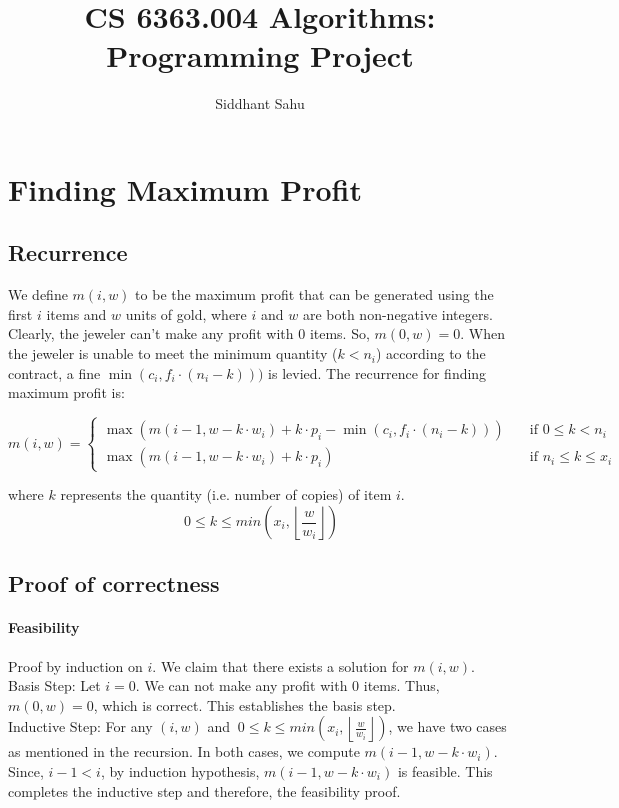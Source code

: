 \documentclass{article}
\title{CS 6363.004 Algorithms: Programming Project}
\author{Siddhant Sahu}
\begin{document}
\maketitle

\section{Finding Maximum Profit}

\subsection{Recurrence}
We define $m(i, w)$ to be the maximum profit that can be generated using the first $i$ items and $w$ units of gold, where $i$ and $w$ are both non-negative integers. Clearly, the jeweler can't make any profit with 0 items. So, $m(0, w) = 0$. 
When the jeweler is unable to meet the minimum quantity ($k < n_i$) according to the contract, a fine $\min (c_i, f_i \cdot (n_i - k)))$ is levied. The recurrence for finding maximum profit is:

\[ m(i, w) =
\begin{cases}
\max (m(i-1, w-k \cdot w_i) + k \cdot p_i - \min (c_i, f_i \cdot (n_i - k)))       & \quad \text{if } 0 \leq k < n_i\\
\max (m(i-1, w-k \cdot w_i) + k \cdot p_i)  & \quad \text{if } n_i \leq k \leq x_i
\end{cases}
\]

where $k$ represents the quantity (i.e. number of copies) of item $i$.
$$\ 0 \leq k \leq min\left(x_i, \left\lfloor\frac{w}{w_i}\right\rfloor\right)$$

\subsection{Proof of correctness}

\paragraph{Feasibility}
Proof by induction on $i$. We claim that there exists a solution for $m(i, w)$.\\
Basis Step: Let $i = 0$. We can not make any profit with 0 items. Thus, $m(0, w) = 0$, which is correct. This establishes the basis step.\\
Inductive Step: For any $(i, w)$ and $\ 0 \leq k \leq min\left(x_i, \left\lfloor\frac{w}{w_i}\right\rfloor\right)$, we have two cases as mentioned in the recursion. In both cases, we compute $m(i-1, w-k \cdot w_i)$. Since, $i-1 < i$, by induction hypothesis, $m(i-1, w-k \cdot w_i)$ is feasible. This completes the inductive step and therefore, the feasibility proof.
\end{document}
